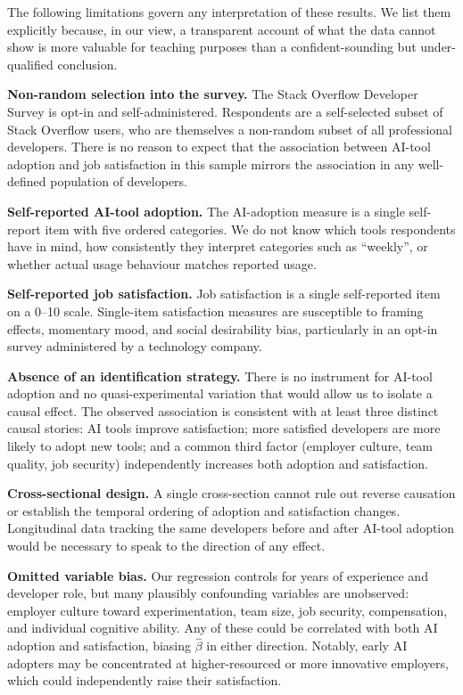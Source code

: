 \documentclass[11pt]{article}
\begin{document}
The following limitations govern any interpretation of these results.
We list them explicitly because, in our view, a transparent account of
what the data cannot show is more valuable for teaching purposes than
a confident-sounding but under-qualified conclusion.

\textbf{Non-random selection into the survey.}
The Stack Overflow Developer Survey is opt-in and self-administered.
Respondents are a self-selected subset of Stack Overflow users, who are
themselves a non-random subset of all professional developers.
There is no reason to expect that the association between AI-tool adoption
and job satisfaction in this sample mirrors the association in any
well-defined population of developers.

\textbf{Self-reported AI-tool adoption.}
The AI-adoption measure is a single self-report item with five ordered
categories. We do not know which tools respondents have in mind, how
consistently they interpret categories such as ``weekly'', or whether
actual usage behaviour matches reported usage.

\textbf{Self-reported job satisfaction.}
Job satisfaction is a single self-reported item on a 0--10 scale.
Single-item satisfaction measures are susceptible to framing effects,
momentary mood, and social desirability bias, particularly in an opt-in
survey administered by a technology company.

\textbf{Absence of an identification strategy.}
There is no instrument for AI-tool adoption and no quasi-experimental
variation that would allow us to isolate a causal effect.
The observed association is consistent with at least three distinct
causal stories: AI tools improve satisfaction; more satisfied developers
are more likely to adopt new tools; and a common third factor (employer
culture, team quality, job security) independently increases both adoption
and satisfaction.

\textbf{Cross-sectional design.}
A single cross-section cannot rule out reverse causation or establish
the temporal ordering of adoption and satisfaction changes.
Longitudinal data tracking the same developers before and after AI-tool
adoption would be necessary to speak to the direction of any effect.

\textbf{Omitted variable bias.}
Our regression controls for years of experience and developer role,
but many plausibly confounding variables are unobserved: employer culture
toward experimentation, team size, job security, compensation, and
individual cognitive ability. Any of these could be correlated with both
AI adoption and satisfaction, biasing $\hat\beta$ in either direction.
Notably, early AI adopters may be concentrated at higher-resourced or
more innovative employers, which could independently raise their
satisfaction.
\end{document}

